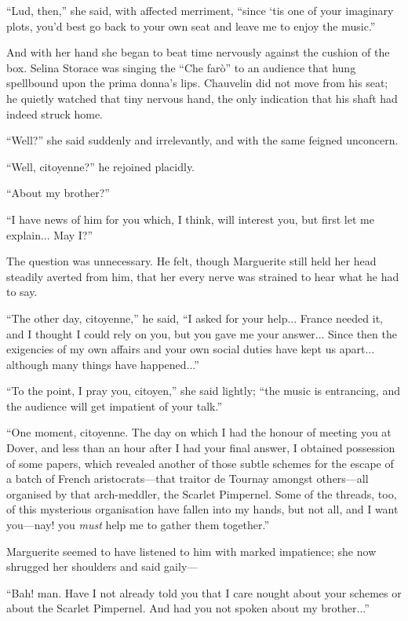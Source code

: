 \documentclass[paper=a5,BCOR=7mm,twoside,DIV=calc,12pt,usegeometry,chapterprefix,endperiod,headings=big]{scrbook}
\begin{document}
\enquote{Lud, then,} she said, with affected merriment, \enquote{since `tis one of your imaginary plots, you'd best go back to your own seat and leave me to enjoy the music.}

And with her hand she began to beat time nervously against the cushion of the box. Selina Storace was singing the \enquote{Che farò} to an audience that hung spellbound upon the prima donna's lips. Chauvelin did not move from his seat; he quietly watched that tiny nervous hand, the only indication that his shaft had indeed struck home.

\enquote{Well?} she said suddenly and irrelevantly, and with the same feigned unconcern.

\enquote{Well, citoyenne?} he rejoined placidly.

\enquote{About my brother?}

\enquote{I have news of him for you which, I think, will interest you, but first let me explain... May I?}

The question was unnecessary. He felt, though Marguerite still held her head steadily averted from him, that her every nerve was strained to hear what he had to say.

\enquote{The other day, citoyenne,} he said, \enquote{I asked for your help... France needed it, and I thought I could rely on you, but you gave me your answer... Since then the exigencies of my own affairs and your own social duties have kept us apart... although many things have happened...}

\enquote{To the point, I pray you, citoyen,} she said lightly; \enquote{the music is entrancing, and the audience will get impatient of your talk.}

\enquote{One moment, citoyenne. The day on which I had the honour of meeting you at Dover, and less than an hour after I had your final answer, I obtained possession of some papers, which revealed another of those subtle schemes for the escape of a batch of French aristocrats---that traitor de Tournay amongst others---all organised by that arch-meddler, the Scarlet Pimpernel. Some of the threads, too, of this mysterious organisation have fallen into my hands, but not all, and I want you---nay! you \textit{must} help me to gather them together.}

Marguerite seemed to have listened to him with marked impatience; she now shrugged her shoulders and said gaily---

\enquote{Bah! man. Have I not already told you that I care nought about your schemes or about the Scarlet Pimpernel. And had you not spoken about my brother...}
\end{document}
